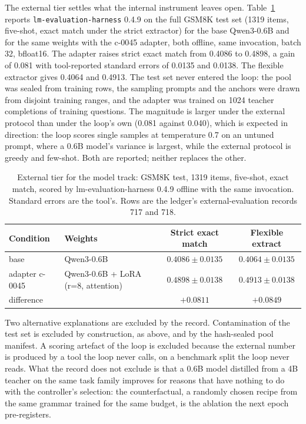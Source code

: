 The external tier settles what the internal instrument leaves open. Table~\ref{tab:p1-external} reports \texttt{lm-evaluation-harness} 0.4.9 on the full GSM8K test set (1319 items, five-shot, exact match under the strict extractor) for the base Qwen3-0.6B and for the same weights with the c-0045 adapter, both offline, same invocation, batch 32, bfloat16. The adapter raises strict exact match from 0.4086 to 0.4898, a gain of 0.081 with tool-reported standard errors of 0.0135 and 0.0138. The flexible extractor gives 0.4064 and 0.4913. The test set never entered the loop: the pool was sealed from training rows, the sampling prompts and the anchors were drawn from disjoint training ranges, and the adapter was trained on 1024 teacher completions of training questions. The magnitude is larger under the external protocol than under the loop's own (0.081 against 0.040), which is expected in direction: the loop scores single samples at temperature 0.7 on an untuned prompt, where a 0.6B model's variance is largest, while the external protocol is greedy and few-shot. Both are reported; neither replaces the other.

\begin{table}[t]
\centering
\caption{External tier for the model track: GSM8K test, 1319 items, five-shot, exact match, scored by lm-evaluation-harness 0.4.9 offline with the same invocation. Standard errors are the tool's. Rows are the ledger's external-evaluation records 717 and 718.}
\label{tab:p1-external}
\begin{tabular}{llcc}
\toprule
\textbf{Condition} & \textbf{Weights} & \textbf{Strict exact match} & \textbf{Flexible extract} \\
\midrule
base & Qwen3-0.6B & $0.4086 \pm 0.0135$ & $0.4064 \pm 0.0135$ \\
adapter c-0045 & Qwen3-0.6B + LoRA (r=8, attention) & $0.4898 \pm 0.0138$ & $0.4913 \pm 0.0138$ \\
\midrule
difference & & $+0.0811$ & $+0.0849$ \\
\bottomrule
\end{tabular}
\end{table}

Two alternative explanations are excluded by the record. Contamination of the test set is excluded by construction, as above, and by the hash-sealed pool manifest. A scoring artefact of the loop is excluded because the external number is produced by a tool the loop never calls, on a benchmark split the loop never reads. What the record does not exclude is that a 0.6B model distilled from a 4B teacher on the same task family improves for reasons that have nothing to do with the controller's selection: the counterfactual, a randomly chosen recipe from the same grammar trained for the same budget, is the ablation the next epoch pre-registers.

